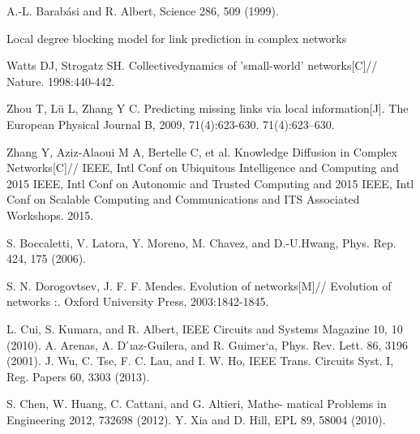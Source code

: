 \documentclass[onecolumn,preprintnumbers,amsmath,amssymb]{revtex4}
\begin{document}
\begin{thebibliography}{00}
A.-L. Barabási and R. Albert, Science 286, 509 (1999).

Local degree blocking model for link prediction in complex networks

Watts DJ, Strogatz SH. Collectivedynamics of ’small-world’ networks[C]// Nature. 1998:440-442.

Zhou T, Lü L, Zhang Y C. Predicting missing links via local information[J]. The European Physical Journal B, 2009, 71(4):623-630.
71(4):623–630. 

Zhang Y, Aziz-Alaoui M A, Bertelle C, et al. Knowledge Diffusion in Complex Networks[C]// IEEE, Intl Conf on Ubiquitous Intelligence and Computing and 2015 IEEE, Intl Conf on Autonomic and Trusted Computing and 2015 IEEE, Intl Conf on Scalable Computing and Communications and ITS Associated Workshops. 2015.

S. Boccaletti, V. Latora, Y. Moreno, M. Chavez, and D.-U.Hwang, Phys. Rep. 424, 175 (2006).

S. N. Dorogovtsev, J. F. F. Mendes. Evolution of networks[M]// Evolution of networks :. Oxford University Press, 2003:1842-1845.


 L. Cui, S. Kumara, and R. Albert, IEEE Circuits and Systems Magazine 10, 10 (2010).
 A. Arenas, A. D ́ıaz-Guilera, and R. Guimer`a, Phys. Rev. Lett. 86, 3196 (2001).
 J. Wu, C. Tse, F. C. Lau, and I. W. Ho, IEEE Trans. Circuits Syst. I, Reg. Papers 60, 3303 (2013).

 S. Chen, W. Huang, C. Cattani, and G. Altieri, Mathe- matical Problems in Engineering 2012, 732698 (2012).
 Y. Xia and D. Hill, EPL 89, 58004 (2010).




\end{thebibliography}
\end{document}
